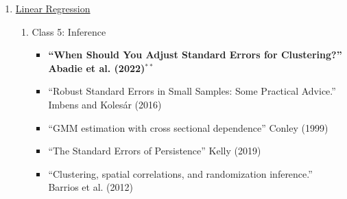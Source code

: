\documentclass[11pt, a4paper]{article}
\begin{document}
\begin{enumerate}
\begin{enumerate}
\begin{itemize}
    \item ``Contamination Bias in Linear Regression,'' Goldsmith-Pinkham, Hull and Koles\'ar (2022)
    \end{itemize}
  \item Class 4: Interference, Spillovers and Dynamics
    \begin{itemize}
      \item \textbf{``Toward Causal Inference With Interference'', Hudgens and Halloran (2008)}$^{**}$
    \item ``Identification of Endogenous Social Effects: The Reflection Problem'' Manski (1993)
    \item ``Social Networks and the Identification of Peer Effects'' Goldsmith-Pinkham and Imbens (2013)
    \item ``Identification of treatment response with social interactions'' Manski (2013)
    \item ``Estimating average causal effects under general interference.'' Aronow, P. M. \& Samii, C. (2017)
    \item ``Exact p-Values for Network Interference'', Athey, Eckles and Imbens (2018)
    \item ``Estimating peer effects in networks with peer encouragement designs'' Eckles, Kizilcec and Bakshy (2016)
    \item ``Causal Inference under Temporal and Spatial Interference.'' Wang (2020) \url{https://www.yewang-polisci.com/publications}
    \item ``How to Use Natural Experiments to Measure Misallocation'' Sraer and Thesmar (2022)
    \end{itemize}
  \end{enumerate}
\item \underline{Linear Regression}
  \begin{enumerate}
  \item Class 5: Inference
    \begin{itemize}
      \item  \textbf{``When Should You Adjust Standard Errors for Clustering?'' Abadie et al. (2022)}$^{**}$
    \item ``Robust Standard Errors in Small Samples: Some Practical Advice.'' Imbens and Koles\'ar  (2016)
    \item ``GMM estimation with cross sectional dependence'' Conley (1999)
    \item ``The Standard Errors of Persistence'' Kelly (2019)
    \item ``Clustering, spatial correlations, and randomization inference.'' Barrios et al. (2012)

\end{itemize}
\end{enumerate}
\end{enumerate}
\end{document}
